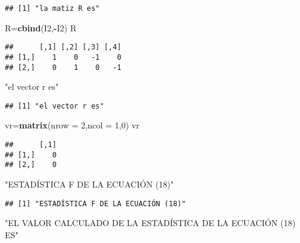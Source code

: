 \documentclass[
]{article}
\newenvironment{Shaded}{\begin{snugshade}}{\end{snugshade}}
\newcommand{\DataTypeTok}[1]{\textcolor[rgb]{0.13,0.29,0.53}{#1}}
\newcommand{\DecValTok}[1]{\textcolor[rgb]{0.00,0.00,0.81}{#1}}
\newcommand{\KeywordTok}[1]{\textcolor[rgb]{0.13,0.29,0.53}{\textbf{#1}}}
\newcommand{\NormalTok}[1]{#1}
\newcommand{\OperatorTok}[1]{\textcolor[rgb]{0.81,0.36,0.00}{\textbf{#1}}}
\newcommand{\StringTok}[1]{\textcolor[rgb]{0.31,0.60,0.02}{#1}}
\begin{document}
\begin{verbatim}
## [1] "la matiz R es"
\end{verbatim}

\begin{Shaded}
\begin{Highlighting}[]
\NormalTok{R=}\KeywordTok{cbind}\NormalTok{(I2,}\OperatorTok{-}\NormalTok{I2)}
\NormalTok{R}
\end{Highlighting}
\end{Shaded}

\begin{verbatim}
##      [,1] [,2] [,3] [,4]
## [1,]    1    0   -1    0
## [2,]    0    1    0   -1
\end{verbatim}

\begin{Shaded}
\begin{Highlighting}[]
\StringTok{"el vector r es"}
\end{Highlighting}
\end{Shaded}

\begin{verbatim}
## [1] "el vector r es"
\end{verbatim}

\begin{Shaded}
\begin{Highlighting}[]
\NormalTok{vr=}\KeywordTok{matrix}\NormalTok{(}\DataTypeTok{nrow =} \DecValTok{2}\NormalTok{,}\DataTypeTok{ncol =} \DecValTok{1}\NormalTok{,}\DecValTok{0}\NormalTok{)}
\NormalTok{vr}
\end{Highlighting}
\end{Shaded}

\begin{verbatim}
##      [,1]
## [1,]    0
## [2,]    0
\end{verbatim}

\begin{Shaded}
\begin{Highlighting}[]
\StringTok{"ESTADÍSTICA F DE LA ECUACIÓN (18)"}
\end{Highlighting}
\end{Shaded}

\begin{verbatim}
## [1] "ESTADÍSTICA F DE LA ECUACIÓN (18)"
\end{verbatim}

\begin{Shaded}
\begin{Highlighting}[]
\StringTok{"EL VALOR CALCULADO DE LA ESTADÍSTICA DE LA ECUACIÓN (18) ES"}
\end{Highlighting}
\end{Shaded}
\end{document}
